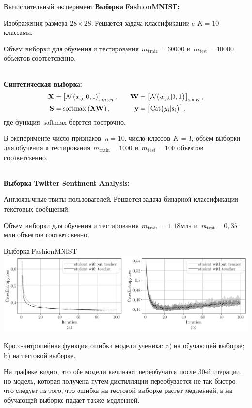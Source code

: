 \documentclass[10pt,pdf,hyperref={unicode}]{beamer}
\begin{document}
\begin{frame}{Вычислительный эксперимент}
\justifying
\textbf{Выборка FashionMNIST:}

Изображения размера $28\times 28$. Решается задача классификации c $K=10$ классами.

Объем выборки для обучения и тестирования~$m_{\text{train}}=60000$ и~$m_{\text{test}}=10000$ объектов соответсвенно.

~\\
\textbf{Синтетическая выборка:}
\[
\setlength\abovedisplayskip{0pt}
\begin{aligned}
\mathbf{X} &= \left[\mathcal{N}\bigr(x_{ij}|0, 1\bigr)\right]_{m\times n},  \quad &\mathbf{W} &= \left[\mathcal{N}\bigr(w_{jk}|0, 1\bigr)\right]_{n\times K}, \\
 \mathbf{S} &= \text{softmax}\left(\mathbf{XW}\right), \quad &\mathbf{y} &= \left[\text{Cat}\bigr(y_i| \mathbf{s}_i\bigr)\right],
\end{aligned}
\setlength\belowdisplayskip{0pt}
\]
где функция~$\text{softmax}$ берется построчно.

В эксперименте число признаков~$n=10$, число классов~$K=3$, объем выборки для обучения и тестирования~$m_{\text{train}}=1000$ и~$m_{\text{test}}=100$ объектов соответсвенно. 

~\\
\textbf{Выборка Twitter Sentiment Analysis:}

Англоязычные твиты пользователей. Решается задача бинарной классификации текстовых сообщений.

Объем выборки для обучения и тестирования~$m_{\text{train}}=1{,}18$млн и~$m_{\text{test}}=0{,}35$млн объектов соответсвенно.

\end{frame}

\begin{frame}{Выборка FashionMNIST}
\justifying
{\center
\includegraphics[width=1\textwidth]{figures/mnist_loss}
}

Кросс-энтропийная функция ошибки модели ученика: a) на обучающей выборке; b) на тестовой выборке.

На графике видно, что обе модели начинают переобучатся после 30-й итерации, но модель, которая получена путем дистилляции переобувается не так быстро, что следует из того, что ошибка на тестовой выборке растет медленней, а на обучающей выборке падает также медленней.



\end{frame}
\end{document}
